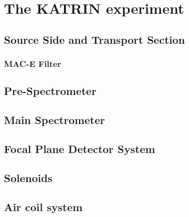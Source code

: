 %

    \chapter{The KATRIN experiment}
    \label{ch:The KATRIN experiment}
      
      \section{Source Side and Transport Section}
      \label{ch:The KATRIN experiment:sec:sourceSide}
      
      \subsection{MAC-E Filter}
      \label{ch:The KATRIN experiment:sec:MAC-E}
      
      \section{Pre-Spectrometer}
      \label{ch:The KATRIN experiment:sec:PreSpectrometer}
      
      \section{Main Spectrometer}
      \label{ch:The KATRIN experiment:sec:MainSpec}
      
      \section{Focal Plane Detector System}
      \label{ch:The KATRIN experiment:sec:mainDetectorSystem}
      
      \section{Solenoids}
      \label{ch:The KATRIN experiment:sec:solenoids}
      
      \section{Air coil system}
      \label{ch:The KATRIN experiment:sec:Air coil system}
